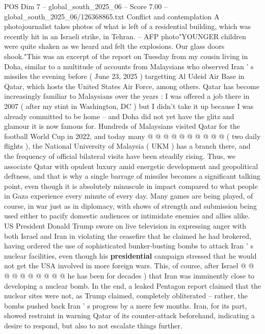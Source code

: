 \begin{textsample}{POS Dim 7 – global\_south\_2025\_06 – Score 7.00 – global\_south\_2025\_06/126368865.txt}  \label{ex:f7_pos_396}
Conflict and contemplation A photojournalist takes photos of what is left of a residential building, which was recently hit in an Israeli strike, in Tehran. -- AFP photo"YOUNGER children were quite shaken as we heard and felt the explosions.
Our glass doors shook."This was an excerpt of the report on Tuesday from my cousin living in Doha, similar to a multitude of accounts from Malaysians who observed Iran ' s missiles the evening before ( June 23, 2025 ) targetting Al Udeid Air Base in Qatar, which hosts the United States Air Force, among others.
Qatar has become increasingly familiar to Malaysians over the years : I was offered a job there in 2007 ( after my stint in Washington, DC ) but I didn't take it up because I was already committed to be home -- and Doha did not yet have the glitz and glamour it is now famous for.
Hundreds of Malaysians visited Qatar for the football World Cup in 2022, and today many @ @ @ @ @ @ @ @ @ @ ( two daily flights ), the National University of Malaysia ( UKM ) has a branch there, and the frequency of official bilateral visits have been steadily rising.
Thus, we associate Qatar with opulent luxury amid energetic development and geopolitical deftness, and that is why a single barrage of missiles becomes a significant talking point, even though it is absolutely minuscule in impact compared to what people in Gaza experience every minute of every day.
Many games are being played, of course, in war just as in diplomacy, with shows of strength and submission being used either to pacify domestic audiences or intimidate enemies and allies alike.
US President Donald Trump swore on live television in expressing anger with both Israel and Iran in violating the ceasefire that he claimed he had brokered, having ordered the use of sophisticated bunker-busting bombs to attack Iran ' s nuclear facilities, even though his \textbf{presidential} campaign stressed that he would not get the USA involved in more foreign wars.
This, of course, after Israel @ @ @ @ @ @ @ @ @ @ he has been for decades ) that Iran was imminently close to developing a nuclear bomb.
In the end, a leaked Pentagon report claimed that the nuclear sites were not, as Trump claimed, completely obliterated -- rather, the bombs pushed back Iran ' s progress by a mere few months.
Iran, for its part, showed restraint in warning Qatar of its counter-attack beforehand, indicating a desire to respond, but also to not escalate things further.

\end{textsample}
